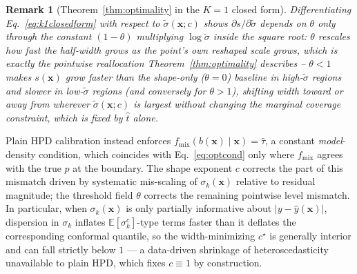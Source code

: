 \documentclass[10pt,twocolumn,a4paper]{article}
\newtheorem{remark}{Remark}
\begin{document}
\begin{remark}[Theorem~\ref{thm:optimality} in the $K=1$ closed form]
Differentiating Eq.~\eqref{eq:k1closedform} with respect to $\tilde\sigma(\bm x;c)$ shows
$\partial s/\partial\tilde\sigma$ depends on $\theta$ only through the constant $(1-\theta)$
multiplying $\log\tilde\sigma$ inside the square root: $\theta$ rescales how fast the half-width
grows as the point's own reshaped scale grows, which is exactly the pointwise reallocation
Theorem~\ref{thm:optimality} describes -- $\theta<1$ makes $s(\bm x)$ grow faster than the shape-only
($\theta=0$) baseline in high-$\tilde\sigma$ regions and slower in low-$\tilde\sigma$ regions
(and conversely for $\theta>1$), shifting width toward or away from wherever $\tilde\sigma(\bm x;c)$
is largest without changing the marginal coverage constraint, which is fixed by $\hat t$ alone.
\end{remark}

Plain HPD calibration instead enforces $f_{\mathrm{mix}}(b(\bm x)\mid\bm x) = \hat\tau$, a constant
\emph{model}-density condition, which coincides with Eq.~\eqref{eq:optcond} only where
$f_{\mathrm{mix}}$ agrees with the true $p$ at the boundary. The shape exponent $c$ corrects the part
of this mismatch driven by systematic mis-scaling of $\sigma_k(\bm x)$ relative to residual
magnitude; the threshold field $\theta$ corrects the remaining pointwise level mismatch. In
particular, when $\sigma_k(\bm x)$ is only partially informative about $|y-\hat y(\bm x)|$, dispersion
in $\sigma_k$ inflates $\mathbb E[\sigma_k^{c}]$-type terms faster than it deflates the corresponding
conformal quantile, so the width-minimizing $c^\star$ is generally interior and can fall strictly
below $1$ — a data-driven shrinkage of heteroscedasticity unavailable to plain HPD, which fixes
$c\equiv1$ by construction.
\end{document}
